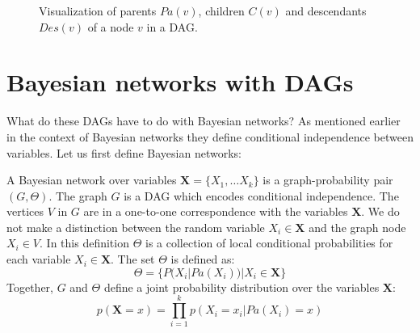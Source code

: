 \begin{figure}[h!]
\begin{minipage}[c]{0.32\textwidth}
{}
\end{minipage}
\caption{Visualization of parents $Pa(v)$, children $C(v)$ and
descendants $Des(v)$ of a node $v$ in a DAG.}
\label{fig:exmpl_child_parent_des}
\end{figure}

\section{Bayesian networks with DAGs}
What do these DAGs have to do with Bayesian networks? As mentioned
earlier in the context of Bayesian networks they define conditional
independence between variables. Let us first define Bayesian networks:

\begin{defn}
A Bayesian network over variables $\textbf{X}=\{X_1,\dots X_k\}$
is a graph-probability pair $(G, \Theta)$. The graph $G$ is a DAG
which encodes conditional independence. The vertices $V$ in $G$ are
in a one-to-one correspondence with the variables $\textbf{X}$. We
do not make a distinction between the random variable $X_i \in 
\textbf{X}$ and the graph node $X_i \in V$. In this definition 
$\Theta$ is a collection of local conditional probabilities for 
each variable $X_i \in \textbf{X}$. The set $\Theta$ is defined as:
\begin{equation}
\Theta = \{P(X_i | Pa(X_i)) | X_i \in \textbf{X}\}
\end{equation}
Together, $G$ and $\Theta$ define a joint probability distribution
over the variables $\textbf{X}$:
\begin{equation}
p(\textbf{X} = x) = \prod_{i=1}^{k} p(X_i = x_i | Pa(X_i) = x)
\end{equation}
\end{defn}

